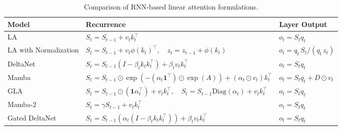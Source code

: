\begin{table}[h!]
\begin{minipage}{0.8\linewidth} %
\centering
\caption{Comparison of RNN-based linear attention formulations.}
\label{tab:ap1}
\begin{tabular}{lll}
\toprule
\textbf{Model} & \textbf{Recurrence} & \textbf{Layer Output}\\
\midrule
LA~\cite{pmlr-v119-katharopoulos20a}& $S_t = S_{t-1} + v_t k_t^\top$ & $o_t = S_t q_t$ \\
LA with Normalization& $S_t = S_{t-1} + v_t \phi(k_t)^\top, \quad z_t = z_{t-1} + \phi(k_t)$ & $o_t = q_t\,S_t / (q_t\,z_t)$\\
DeltaNet~\cite{schlag2021linear}& $S_t = S_{t-1}(I - \beta_t k_t k_t^\top) + \beta_t v_t k_t^\top$ & $o_t = S_t q_t$ \\
Mamba~\cite{gu2023mamba}& $S_t = S_{t-1} \odot \exp(-(\alpha_t \mathbf{1}^\top) \odot \exp(A)) + (\alpha_t \odot v_t) k_t^\top$ & $o_t = S_t q_t + D \odot v_t$ \\
GLA~\cite{yang2023gated}& $S_t = S_{t-1} \odot (\mathbf{1} \alpha_t^\top) + v_t k_t^\top, \quad S_t = S_{t-1} \text{Diag}(\alpha_t) + v_t k_t^\top$ & $o_t = S_t q_t$ \\
Mamba-2~\cite{dao2024transformers}& $S_t = \gamma S_{t-1} + v_t k_t^\top$ & $o_t = S_t q_t$ \\
Gated DeltaNet~\cite{yang2024gated}& $S_t = S_{t-1} \left(\alpha_t (I - \beta_t k_t k_t^\top) \right) + \beta_t v_t k_t^\top$ & $o_t = S_t q_t$ \\
\bottomrule
\end{tabular}
\end{minipage} %
\end{table}

